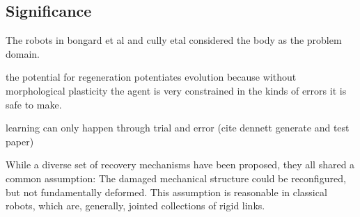 




\subsection{Significance}

The robots in bongard et al and cully etal considered the body as the problem domain.

the potential for regeneration potentiates evolution because without morphological plasticity the agent is very constrained in the kinds of errors it is safe to make.

learning can only happen through trial and error (cite dennett generate and test paper)


While a diverse set of recovery mechanisms have been proposed, they all  
shared a common assumption: 
The damaged mechanical structure could be 
reconfigured, but not fundamentally deformed.
This assumption is reasonable in classical robots, which are, generally, jointed collections of rigid links.


